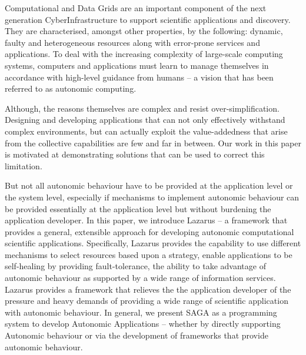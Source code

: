 \documentclass{sig-alternate}
\begin{document}
Computational and Data Grids are an important component of the next
generation CyberInfrastructure to support scientific applications and
discovery.  They are characterised, amongst other properties, by
the following: dynamic, faulty and heterogeneous resources along with
error-prone services and applications.  To deal with the increasing
complexity of large-scale computing systems, computers and
applications must learn to manage themselves in accordance with
high-level guidance from humans -- a vision that has been referred to
as autonomic computing.

Although, the reasons themselves are complex and resist
over-simplification.  Designing and developing applications that can
not only effectively withstand complex environments, but can actually
exploit the value-addedness that arise from the collective
capabilities are few and far in between.  Our work in this paper is
motivated at demonstrating solutions that can be used to correct this
limitation.

But not all autonomic behaviour have to be provided at the application
level or the system level, especially if mechanisms to implement
autonomic behaviour can be provided essentially at the application
level but without burdening the application developer.  In this paper,
we introduce Lazarus -- a framework that provides a general,
extensible approach for developing autonomic computational scientific
applications. Specifically, Lazarus provides the capability to use
different mechanisms to select resources based upon a strategy, enable
applications to be self-healing by providing fault-tolerance, the
ability to take advantage of autonomic behaviour as supported by a
wide range of information services. Lazarus provides a framework that
relieves the the application developer of the pressure and heavy
demands of providing a wide range of scientific application with
autonomic behaviour.  In general, we present SAGA as a programming
system to develop Autonomic Applications -- whether by directly
supporting Autonomic behaviour or via the development of frameworks
that provide autonomic behaviour.



\end{document}
